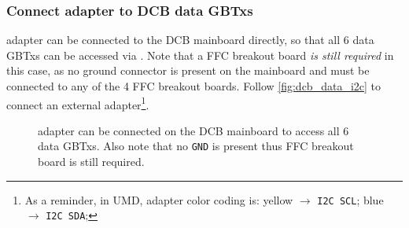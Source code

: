 \subsubsection{Connect \itwoc adapter to DCB data GBTxs}
\label{sec:dcb-data-i2c}
\itwoc adapter can be connected to the DCB mainboard directly, so that all 6
data GBTxs can be accessed via \itwoc.
Note that a FFC breakout board \emph{is still required} in this case, as no
ground connector is present on the mainboard and must be connected to any of the
4 FFC breakout boards.
Follow \autoref{fig:dcb_data_i2c} to connect an external \itwoc
adapter\footnote{
    As a reminder, in UMD, \itwoc adapter color coding is:
    yellow $\rightarrow$ \texttt{I2C SCL};
    blue $\rightarrow$ \texttt{I2C SDA};
}.

\begin{figure}[!ht]
\centering
{}
\caption{
    \itwoc adapter can be connected on the DCB mainboard to access all 6 data
    GBTxs.
    Also note that no \texttt{GND} is present thus FFC breakout board is still
    required.
}
\label{fig:dcb_data_i2c}
\end{figure}
